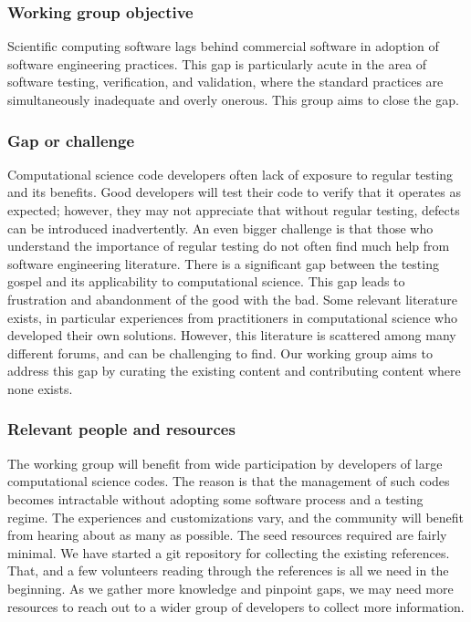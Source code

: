 \subsubsection{Working group objective}
Scientific computing software lags behind commercial software in
adoption of software engineering practices. This
gap is particularly acute in the area of software testing,
verification, and validation, where the standard practices are
simultaneously inadequate and overly onerous.
This group aims to close the gap.

\subsubsection{Gap or challenge}
Computational science code developers often lack of exposure to
regular testing and its benefits. Good developers will test their code to
verify that it operates as expected; however, they may not appreciate
that without regular testing, defects can be introduced
inadvertently. An even bigger challenge is that those who understand
the importance of regular testing do not often find much help from
software engineering literature. There is a significant gap between
the testing gospel and its applicability to computational science. This
gap leads to frustration and abandonment of the good with the bad. Some
relevant literature exists, in particular experiences from
practitioners in computational science who developed their own
solutions. However, this literature is scattered among many different
forums, and can be challenging to find. Our working group aims to
address this gap by curating the existing content and contributing
content where none exists.

\subsubsection{Relevant people and resources}

The working group will benefit from wide participation by developers
of large computational science codes. The reason is that the
management of such codes becomes intractable without adopting some
software process and a testing regime. The experiences and
customizations vary, and the community will benefit from hearing about
as many as possible. The seed resources required are fairly
minimal. We have started a git repository for collecting the
existing references. That, and a few volunteers reading through the
references is all we need in the beginning. As we gather more
knowledge and pinpoint gaps, we may need more resources to reach out
to a wider group of developers to collect more information.


